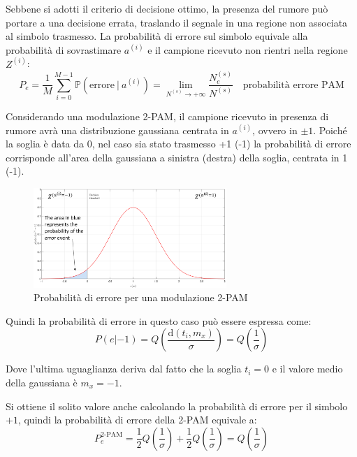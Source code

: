 \begin{center}
    
\end{center}



Sebbene si adotti il criterio di decisione ottimo, la presenza del rumore può portare a una decisione errata, traslando il segnale in una regione non associata al simbolo trasmesso.
La probabilità di errore sul simbolo equivale alla probabilità di sovrastimare $a^{(i)}$ e il campione ricevuto non rientri nella regione $Z^{(i)}$:
\[
    P_e = \frac{1}{M} \sum_{i=0}^{M-1} \mathbb{P}(\text{errore} \ | \ a^{(i)}) = \lim_{N^{(s)} \to +\infty} \frac{N_e^{(s)}}{N^{(s)}} \quad \text{probabilità errore PAM}
\]

Considerando una modulazione 2-PAM, il campione ricevuto in presenza di rumore avrà una distribuzione gaussiana centrata in $a^{(i)}$, ovvero in $\pm 1$. Poiché la soglia è data da 0, nel caso sia stato trasmesso +1 (-1) la probabilità di errore corrisponde all'area della gaussiana a sinistra (destra) della soglia, centrata in 1 (-1).

\begin{figure}[ht]
    \centering
    \includegraphics[width=0.65\textwidth]{imgs/2pamerror.jpg}
    \caption*{Probabilità di errore per una modulazione 2-PAM}
\end{figure}


Quindi la probabilità di errore in questo caso può essere espressa come:
\[
    P(e | -1) = Q\left(\frac{\text{d}(t_i, m_x)}{\sigma}\right) = Q\left(\frac{1}{\sigma}\right)
\]

Dove l'ultima uguaglianza deriva dal fatto che la soglia $t_i=0$ e il valore medio della gaussiana è $m_x = -1$.

Si ottiene il solito valore anche calcolando la probabilità di errore per il simbolo $+1$, quindi la probabilità di errore della 2-PAM equivale a:
\[
    P^{\text{2-PAM}}_e = \frac{1}{2} Q\left(\frac{1}{\sigma}\right) + \frac{1}{2} Q\left(\frac{1}{\sigma}\right) = Q\left(\frac{1}{\sigma}\right)
\]

